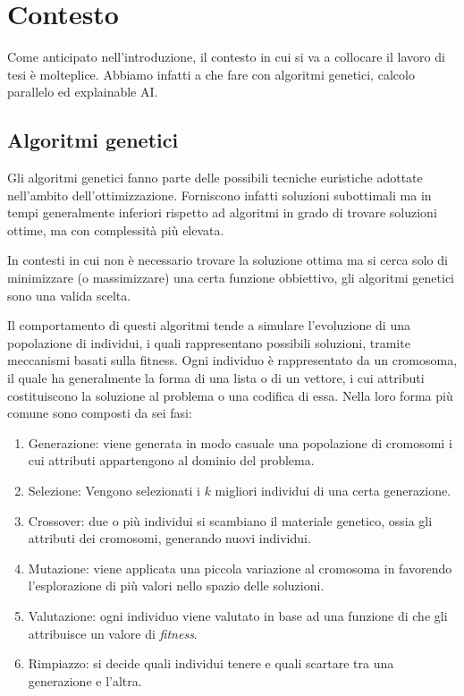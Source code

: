\chapter{Contesto}

Come anticipato nell'introduzione, il contesto in cui si va a collocare il
lavoro di tesi è molteplice. Abbiamo infatti a che fare con algoritmi genetici,
calcolo parallelo ed explainable AI.

\section{Algoritmi genetici}

Gli algoritmi genetici fanno parte delle possibili tecniche euristiche adottate
nell'ambito dell'ottimizzazione. Forniscono infatti soluzioni subottimali ma
in tempi generalmente inferiori rispetto ad algoritmi in grado di trovare
soluzioni ottime, ma con complessità più elevata.

In contesti in cui non è necessario trovare la soluzione ottima ma si cerca
solo di minimizzare (o massimizzare) una certa funzione obbiettivo, gli
algoritmi genetici sono una valida scelta.

Il comportamento di questi algoritmi tende a simulare l'evoluzione di una
popolazione di individui, i quali rappresentano possibili soluzioni, tramite
meccanismi basati sulla fitness. Ogni individuo è rappresentato da un cromosoma,
il quale ha generalmente la forma di una lista o di un vettore, i cui attributi
costituiscono la soluzione al problema o una codifica di essa. Nella loro forma
più comune sono composti da sei fasi:

\begin{enumerate}
	\item Generazione: viene generata in modo casuale una popolazione di
	      cromosomi i cui attributi appartengono al dominio del problema.
	\item Selezione: Vengono selezionati i $k$ migliori individui di una certa
	      generazione.
	\item Crossover: due o più individui si scambiano il materiale genetico,
	      ossia gli attributi dei cromosomi, generando nuovi individui.
	\item Mutazione: viene applicata una piccola variazione al cromosoma in
	      favorendo l'esplorazione di più valori nello spazio delle soluzioni.
	\item Valutazione: ogni individuo viene valutato in base ad una funzione di
	      che gli attribuisce un valore di \textit{fitness}.
	\item Rimpiazzo: si decide quali individui tenere e quali scartare tra una
	      generazione e l'altra.
\end{enumerate}

